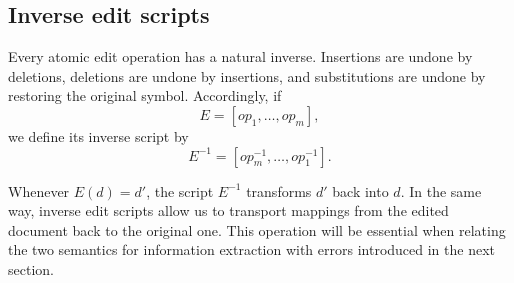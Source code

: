 \subsection{Inverse edit scripts}

Every atomic edit operation has a natural inverse. Insertions are undone by deletions, deletions are undone by insertions, and substitutions are undone by restoring the original symbol. Accordingly, if
\[
E=[op_1,\dots,op_m],
\]
we define its inverse script by
\[
E^{-1} = [op_m^{-1},\dots,op_1^{-1}].
\]

Whenever $E(d)=d'$, the script $E^{-1}$ transforms $d'$ back into $d$. In the same way, inverse edit scripts allow us to transport mappings from the edited document back to the original one. This operation will be essential when relating the two semantics for information extraction with errors introduced in the next section.